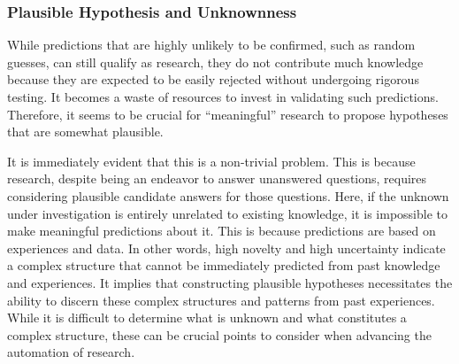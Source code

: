 \documentclass{book}
\begin{document}



\subsubsection{Plausible Hypothesis and Unknownness}

While predictions that are highly unlikely to be confirmed, such as random guesses, can still qualify as research, they do not contribute much knowledge because they are expected to be easily rejected without undergoing rigorous testing. It becomes a waste of resources to invest in validating such predictions. Therefore, it seems to be crucial for ``meaningful'' research to propose hypotheses that are somewhat plausible.

It is immediately evident that this is a non-trivial problem. This is because research, despite being an endeavor to answer unanswered questions, requires considering plausible candidate answers for those questions. Here, if the unknown under investigation is entirely unrelated to existing knowledge, it is impossible to make meaningful predictions about it. This is because predictions are based on experiences and data. In other words, high novelty and high uncertainty indicate a complex structure that cannot be immediately predicted from past knowledge and experiences. It implies that constructing plausible hypotheses necessitates the ability to discern these complex structures and patterns from past experiences. While it is difficult to determine what is unknown and what constitutes a complex structure, these can be crucial points to consider when advancing the automation of research.
\end{document}
